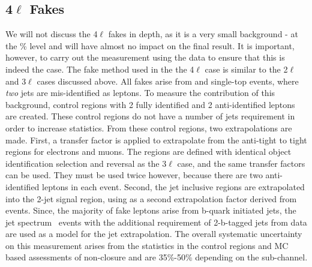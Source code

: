 \subsection{4$\ell$ Fakes}

We will not discuss the 4$\ell$ fakes in depth, as it is a very small background - at the \% level and will have almost no impact on the final result. It is important, however, to carry out the measurement using the data to ensure that this is indeed the case. The fake method used in the the 4$\ell$ case is similar to the 2$\ell$ and 3$\ell$ cases discussed above. All fakes arise from \ttbar and single-top events, where {\it two} jets are mis-identified as leptons. To measure the contribution of this background, control regions with 2 fully identified and 2 anti-identified leptons are created. These control regions do not have a number of jets requirement in order to increase statistics.  From these control regions, two extrapolations are made. First, a transfer factor is applied to extrapolate from the anti-tight to tight regions for electrons and muons. The regions are defined with identical object identification selection and reversal as the 3$\ell$ case, and the same transfer factors can be used. They must be used twice however, because there are two anti-identified leptons in each event. Second, the jet inclusive regions are extrapolated into the 2-jet signal region, using as a second extrapolation factor derived from \ttbar events. Since, the majority of fake leptons arise from b-quark initiated jets, the jet spectrum \ttbar\ events with the additional requirement of 2-b-tagged jets from data are used as a model for the jet extrapolation. The overall systematic uncertainty on this measurement arises from the statistics in the control regions and MC based assessments of non-closure and are 35\%-50\% depending on the sub-channel. 


